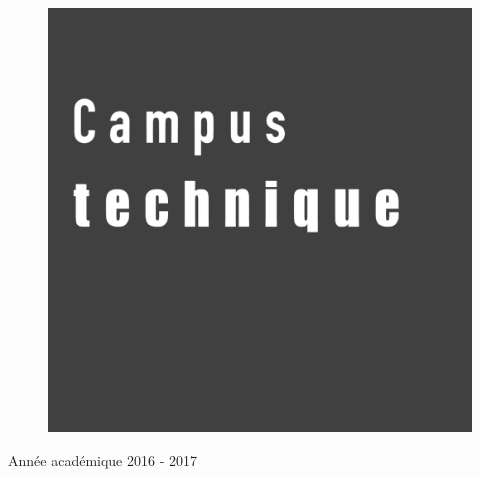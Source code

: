 \begin{center}
  \vspace{1cm}

  \begin{figure}[!h]
    \centering
    \includegraphics[scale=0.08]{textures/logo/technical_bw.pdf}
  \end{figure}
  
  \vspace{0.5cm}

  Année académique 2016 - 2017
\end{center}

\thispagestyle{empty}
